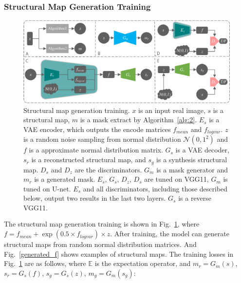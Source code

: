 \documentclass[runningheads]{llncs}
\begin{document}
	\subsubsection{Structural Map Generation Training}
	\begin{figure}[th]
		\centering
		\includegraphics[width=1\columnwidth]{figures/feature_train}
		\caption{Structural map generation training. $x$ is an input real image, $s$ is a structural map, $m$ is a mask extract by Algorithm~\ref{alg:2}. $E_s$ is a VAE encoder, which outputs the encode matrices $f_{mean}$ and $f_{logvar}$. $z$ is a random noise sampling from normal distribution $\mathcal{N}(0,1^2)$ and $f$ is a approximate normal distribution matrix. $G_s$ is a VAE decoder, $s_r$ is a reconstructed structural map, and $s_g$ is a synthesis structural map. $D_{s}$ and $D_{z}$ are the discriminators. $G_m$ is a mask generator and $m_r$ is a generated mask. $E_s $, $G_s$, $D_{z} $, $D_{s} $ are tuned on VGG11\cite{102simonyan2014very}, $G_m $ is tuned on U-net\cite{6zhu2017unpaired}. $E_s$ and all discriminators, including those described below, output two results in the last two layers. $G_s$ is a reverse VGG11. }
		\label{feature_train}
	\end{figure}
	The structural map generation training is shown in Fig.~\ref{feature_train}, where $f=f_{mean}+\exp(0.5\times f_{logvar})\times z$. After training, the model can generate structural maps from random normal distribution matrices. And Fig.~\ref{generated_f} shows examples of structural maps. The training losses in Fig.~\ref{feature_train} are as follows, where $\mathbb{E}$ is the expectation operator, and $m_r=G_m(s)$, $s_r=G_s(f)$, $s_g=G_s(z)$, $m_g=G_m(s_g)$: 
\end{document}
